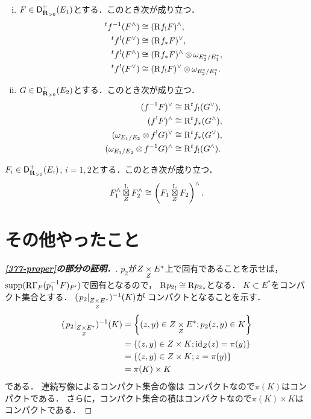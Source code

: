 \begin{PRP}[{\cite[Proposition 3.7.14]{KS90}}]
    \begin{enumerate}[(i)]
        \item \(F\in\Dlcon(E_1)\)とする．このとき次が成り立つ．
        \begin{align*}
            {}^tf^{-1}(F^\wedge)&\cong (\Rder{f}_!F)^\wedge,\\
            {}^tf^{!}(F^\vee)&\cong (\Rder{f}_\ast F)^\vee,\\
            {}^tf^{!}(F^\wedge)&\cong (\Rder{f}_{\ast}F)^\wedge\tens\omega_{E_2^\ast/E_1^\ast},\\
            {}^tf^{!}(F^\vee)&\cong (\Rder{f}_{!}F)^\vee\tens\omega_{E_2^\ast/E_1^\ast}.
        \end{align*}
        \item \(G\in\Dlcon(E_2)\)とする．このとき次が成り立つ．
        \begin{align*}
            (f^{-1}F)^\vee&\cong \Rder^t{f}_!(G^\vee),\\
            (f^{!}F)^\wedge&\cong \Rder^t{f}_\ast(G^\wedge),\\
            (\omega_{E_1/E_2}\tens f^!G)^\vee&\cong \Rder^t{f}_\ast(G^\vee),\\
            (\omega_{E_1/E_2}\tens f^{-1}G)^\wedge&\cong \Rder^t{f}_!(G^\wedge).
        \end{align*}
    \end{enumerate}
\end{PRP}
\begin{PRP}[{\cite[Proposition 3.7.15]{KS90}}]
    \(F_i\in\Dlcon(E_i)\), \(i=1,2\)とする．このとき次が成り立つ．
    \[
        F_1^\wedge\letens[Z]F_2^\wedge
        \cong
        \left(F_1\letens[Z]F_2\right)^\wedge.
    \]
\end{PRP}

\section{その他やったこと}
\begin{proof}[\textbf{\eqref{377-proper}の部分の証明．}]
    \(p_2\)が\(Z\pb[Z]E^{\ast}\)上で固有であることを示せば，
    \(\supp(\RG_{P}(p_1^{-1}F)_{P'})\)で固有となるので，
    \(\Rder{p_2}_!\cong\Rder{p_2}_{\ast}\)となる．
    \(K\subset E^{\ast}\)をコンパクト集合とする．
    \((\mres[p_2]{Z\pb[Z]E^{\ast}})^{-1}(K)\)が
    コンパクトとなることを示す．
    \begin{align*}
        (\mres[p_2]{Z\pb[Z]E^{\ast}})^{-1}(K)
        &=\left\{
            (z,y)\in Z\pb[Z]E^{\ast};
            p_2(z,y)\in K
        \right\}\\
        &=\left\{
            (z,y)\in Z\times K;\id_Z(z)=\pi(y)
        \right\}\\
        &=\left\{
            (z,y)\in Z\times K;z=\pi(y)
        \right\}\\
        &=\pi(K)\times K
    \end{align*}
    である．
    連続写像によるコンパクト集合の像は
    コンパクトなので\(\pi(K)\)はコンパクトである．
    さらに，コンパクト集合の積はコンパクトなので\(\pi(K)\times K\)は
    コンパクトである．
\end{proof}

